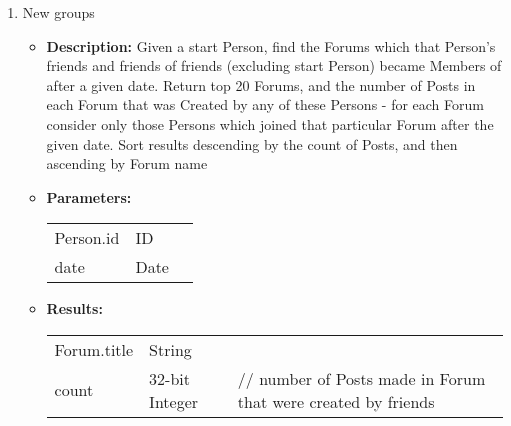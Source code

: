{\begin{enumerate}
	\item New groups
	\begin{itemize}
		\item \textbf{Description:}
            Given a start Person, find the Forums which that Person's friends
            and friends of friends (excluding start Person) became Members of
            after a given date.  Return top 20 Forums, and the number of Posts
            in each Forum that was Created by any of these Persons - for each
            Forum consider only those Persons which joined that particular
            Forum after the given date.  Sort results descending by the count
            of Posts, and then ascending by Forum name
		\item \textbf{Parameters:} \\
			\begin{tabular}{lll}
				Person.id 										& ID & \\
				date 											& Date & \\
			\end{tabular}		
		\item \textbf{Results:} \\
			\begin{tabular}{lll}
				Forum.title 										& String & \\
				count 	 											& 32-bit Integer & \parbox[t]{20cm}{// number of Posts made in Forum that were created 																							by friends \par \strut} \\
			\end{tabular}		
	\end{itemize}


\end{enumerate}}
